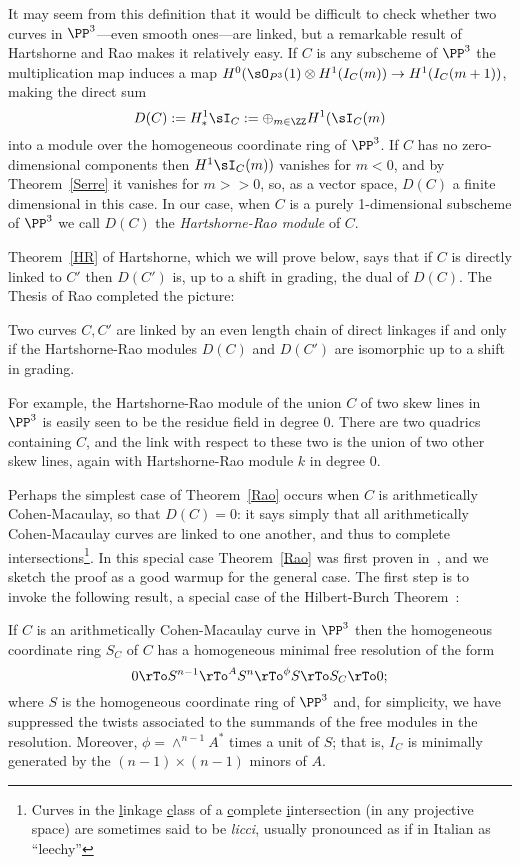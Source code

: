 It may seem from this definition that it would be difficult to check whether two curves in $\PP^3$---even smooth ones---are linked, but
a remarkable result of Hartshorne and Rao makes it relatively easy. If $C$ is any subscheme of $\PP^3$ the multiplication map
induces a map
$H^0(\sO_{P^3}(1) \otimes H^1(I_C(m)) \to H^1(I_C(m+1))$, making the direct sum
$$
D(C) := H^1_*\sI_C := \oplus_{m\in \ZZ} H^1(\sI_C(m)
$$
into a module over the homogeneous coordinate ring of $\PP^3$. If $C$ has no zero-dimensional components then $H^1\sI_C(m))$ vanishes
for $m<0$, and by Theorem~\ref{Serre} it vanishes for $m>>0$, so, as a vector space, $D(C)$ a finite dimensional in this case.
In our case, when $C$ is a purely 1-dimensional subscheme of $\PP^3$ we call $D(C)$ the \emph{Hartshorne-Rao module} of $C$.

Theorem~\ref{HR} of Hartshorne, which we will prove below,
says that if $C$ is directly linked to $C'$ then $D(C')$ is, up to a shift in grading, the dual of $D(C)$. The Thesis of Rao completed the picture:

\begin{theorem}\cite{MR520926}\label{Rao}
Two curves $C,C'$ are linked by an even length chain of direct linkages if and only if 
the Hartshorne-Rao modules $D(C)$ and $D(C')$ are isomorphic up to a shift in grading.
\end{theorem}

For example, the Hartshorne-Rao module of the union $C$ of two skew lines in $\PP^3$ is easily seen to be the residue field in degree 0. There are
two quadrics containing $C$, and the link with respect to these two is the union of two other skew lines, again with Hartshorne-Rao module
$k$ in degree 0. 

Perhaps the simplest case of Theorem~\ref{Rao} occurs when $C$ is arithmetically Cohen-Macaulay, so that $D(C) = 0$: it says simply that all 
arithmetically Cohen-Macaulay curves are linked to one another, and thus to complete intersections\footnote{Curves in the {\underline l}inkage 
{\underline c}lass of a {\underline c}omplete {\underline i}intersection (in any projective space) are sometimes said to be \emph{licci}, usually
pronounced as if in Italian as ``leechy''}. In this special case Theorem~\ref{Rao} was first proven in~\cite{Gaeta}, and we sketch the
 proof as a good warmup for the general case.
The first step is to invoke the following result, a special case of the Hilbert-Burch Theorem~\cite[Section 20.4]{Eisenbud1995}:

\begin{theorem}\label{Hilbert-Burch Theorem}
If $C$ is an arithmetically Cohen-Macaulay curve in $\PP^3$ then the homogeneous coordinate ring $S_C$ of $C$ has a homogeneous
minimal free resolution of the form
$$
0\rTo S^{n-1} \rTo^A S^n \rTo^\phi S \rTo S_C \rTo 0;
$$
where $S$ is the homogeneous coordinate ring of $\PP^3$ and, for simplicity, we have suppressed the twists associated to the summands of the
free modules in the resolution. Moreover, $\phi = \wedge^{n-1}A^*$ times a unit of $S$; that is, $I_C$ is minimally generated by the 
$(n-1)\times (n-1)$ minors of $A$.
\end{theorem}

